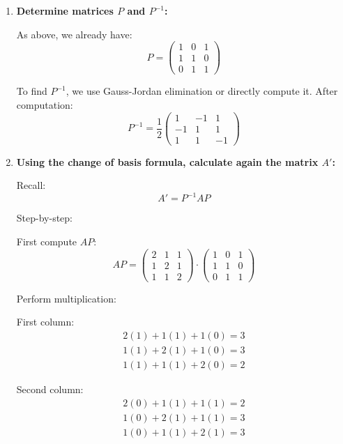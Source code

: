 \documentclass[12pt]{article}
\begin{document}
\begin{answerbox}
\begin{enumerate}
\begin{enumerate}
        \item \textbf{Determine matrices $ P $ and $ P^{-1} $:}

        As above, we already have:
        $$
        P = \begin{pmatrix}
        1 & 0 & 1 \\
        1 & 1 & 0 \\
        0 & 1 & 1
        \end{pmatrix}
        $$

        To find $ P^{-1} $, we use Gauss-Jordan elimination or directly compute it. After computation:
        $$
        P^{-1} = \frac{1}{2}
        \begin{pmatrix}
        1 & -1 & 1 \\
        -1 & 1 & 1 \\
        1 & 1 & -1
        \end{pmatrix}
        $$

        \item \textbf{Using the change of basis formula, calculate again the matrix $ A' $:}

        Recall:
        $$
        A' = P^{-1} A P
        $$

        Step-by-step:

        First compute $ A P $:
        $$
        AP = 
        \begin{pmatrix}
        2 & 1 & 1 \\
        1 & 2 & 1 \\
        1 & 1 & 2
        \end{pmatrix}
        \cdot
        \begin{pmatrix}
        1 & 0 & 1 \\
        1 & 1 & 0 \\
        0 & 1 & 1
        \end{pmatrix}
        $$

        Perform multiplication:

        First column:
        $$
        \begin{aligned}
        2(1) + 1(1) + 1(0) = 3 \\
        1(1) + 2(1) + 1(0) = 3 \\
        1(1) + 1(1) + 2(0) = 2
        \end{aligned}
        $$

        Second column:
        $$
        \begin{aligned}
        2(0) + 1(1) + 1(1) = 2 \\
        1(0) + 2(1) + 1(1) = 3 \\
        1(0) + 1(1) + 2(1) = 3
        \end{aligned}
        $$


\end{enumerate}
\end{enumerate}
\end{answerbox}
\end{document}
